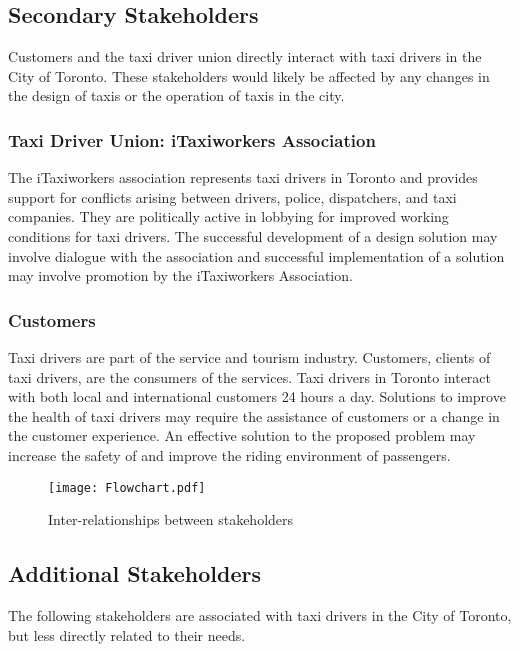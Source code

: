 \documentclass[11pt]{article}
\begin{document}
\subsection{Secondary Stakeholders} 
Customers and the taxi driver union directly interact with taxi 
drivers in the City of Toronto. These stakeholders would likely be 
affected by any changes in the design of taxis or the operation of taxis 
in the city. 

\subsubsection{Taxi Driver Union: iTaxiworkers Association}
The iTaxiworkers association represents taxi drivers in Toronto and provides 
support for conflicts arising between drivers, police, dispatchers, and 
taxi companies. They are politically active in lobbying for improved 
working conditions for taxi drivers. The successful development of a 
design solution may involve dialogue with the association and
successful implementation of a solution may involve promotion by the 
iTaxiworkers Association\cite{itaxi}. 


\subsubsection{Customers}
Taxi drivers are part of the service and tourism industry. Customers,
clients of taxi drivers, are the consumers of the services. Taxi 
drivers in Toronto interact with both local and international customers 
24 hours a day. Solutions to improve the health of taxi drivers 
may require the assistance of customers or a change in the customer 
experience. An effective solution to the proposed problem may increase 
the safety of and improve the riding environment of passengers. 
 
\begin{figure}
  \centering
  \texttt{[image: Flowchart.pdf]}
  \caption{Inter-relationships between stakeholders}
\end{figure}
\subsection{Additional Stakeholders}

The following stakeholders are associated with taxi drivers in the City 
of Toronto, but less directly related to their needs. 
\end{document}
